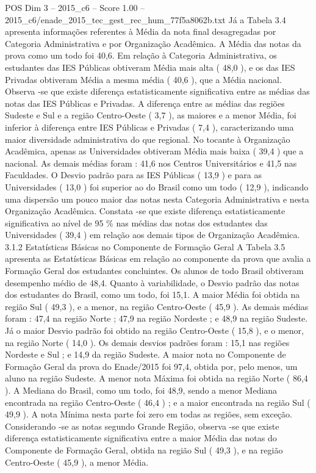 \begin{textsample}{POS Dim 3 – 2015\_c6 – Score 1.00 – 2015\_c6/enade\_2015\_tec\_gest\_rec\_hum\_77f5a8062b.txt}
Já a Tabela 3.4 apresenta informações referentes à Média da nota final desagregadas por Categoria Administrativa e por Organização Acadêmica.
A Média das notas da prova como um todo foi 40,6.
Em relação à Categoria Administrativa, os estudantes das IES Públicas obtiveram Média mais alta ( 48,0 ), e os das IES Privadas obtiveram Média a mesma média ( 40,6 ), que a Média nacional.
Observa -se que existe diferença estatisticamente significativa entre as médias das notas das IES Públicas e Privadas.
A diferença entre as médias das regiões Sudeste e Sul e a região Centro-Oeste ( 3,7 ), as maiores e a menor Média, foi inferior à diferença entre IES Públicas e Privadas ( 7,4 ), caracterizando uma maior diversidade administrativa do que regional.
No tocante à Organização Acadêmica, apenas as Universidades obtiveram Média mais baixa ( 39,4 ) que a nacional.
As demais médias foram : 41,6 nos Centros Universitários e 41,5 nas Faculdades.
O Desvio padrão para as IES Públicas ( 13,9 ) e para as Universidades ( 13,0 ) foi superior ao do Brasil como um todo ( 12,9 ), indicando uma dispersão um pouco maior das notas nesta Categoria Administrativa e nesta Organização Acadêmica.
Constata -se que existe diferença estatisticamente significativa ao nível de 95 \% nas médias das notas dos estudantes das Universidades ( 39,4 ) em relação aos demais tipos de Organização Acadêmica. 3.1.2 Estatísticas Básicas no Componente de Formação Geral A Tabela 3.5 apresenta as Estatísticas Básicas em relação ao componente da prova que avalia a Formação Geral dos estudantes concluintes.
Os alunos de todo Brasil obtiveram desempenho médio de 48,4.
Quanto à variabilidade, o Desvio padrão das notas dos estudantes do Brasil, como um todo, foi 15,1.
A maior Média foi obtida na região Sul ( 49,3 ), e a menor, na região Centro-Oeste ( 45,9 ).
As demais médias foram : 47,4 na região Norte ; 47,9 na região Nordeste ; e 48,9 na região Sudeste.
Já o maior Desvio padrão foi obtido na região Centro-Oeste ( 15,8 ), e o menor, na região Norte ( 14,0 ).
Os demais desvios padrões foram : 15,1 nas regiões Nordeste e Sul ; e 14,9 da região Sudeste.
A maior nota no Componente de Formação Geral da prova do Enade/2015 foi 97,4, obtida por, pelo menos, um aluno na região Sudeste.
A menor nota Máxima foi obtida na região Norte ( 86,4 ).
A Mediana do Brasil, como um todo, foi 48,9, sendo a menor Mediana encontrada na região Centro-Oeste ( 46,4 ) ; e a maior encontrada na região Sul ( 49,9 ).
A nota Mínima nesta parte foi zero em todas as regiões, sem exceção.
Considerando -se as notas segundo Grande Região, observa -se que existe diferença estatisticamente significativa entre a maior Média das notas do Componente de Formação Geral, obtida na região Sul ( 49,3 ), e na região Centro-Oeste ( 45,9 ), a menor Média.

\end{textsample}
